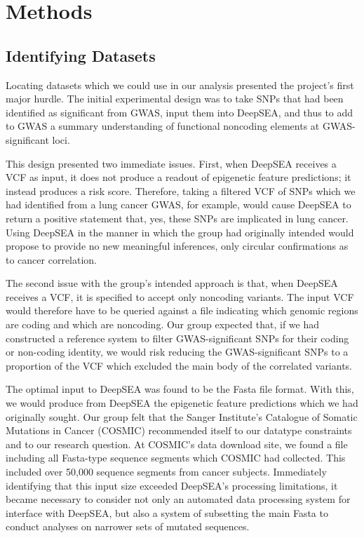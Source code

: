\documentclass{article}
\begin{document}
\section{Methods}

\subsection{Identifying Datasets}
Locating datasets which we could use in our analysis presented the project's first major hurdle. The initial experimental design was to take SNPs that had been identified as significant from GWAS, input them into DeepSEA, and thus to add to GWAS a summary understanding of functional noncoding elements at GWAS-significant loci.  

This design presented two immediate issues. First, when DeepSEA receives a VCF as input, it does not produce a readout of epigenetic feature predictions; it instead produces a risk score. Therefore, taking a filtered VCF of SNPs which we had identified from a lung cancer GWAS, for example, would cause DeepSEA to return a positive statement that, yes, these SNPs are implicated in lung cancer. Using DeepSEA in the manner in which the group had originally intended would propose to provide no new meaningful inferences, only circular confirmations as to cancer correlation. 

The second issue with the group's intended approach is that, when DeepSEA receives a VCF, it is specified to accept only noncoding variants. The input VCF would therefore have to be queried against a file indicating which genomic regions are coding and which are noncoding. Our group expected that, if we had constructed a reference system to filter GWAS-significant SNPs for their coding or non-coding identity, we would risk reducing the GWAS-significant SNPs to a proportion of the VCF which excluded the main body of the correlated variants.

The optimal input to DeepSEA was found to be the Fasta file format. With this, we would produce from DeepSEA the epigenetic feature predictions which we had originally sought. Our group felt that the Sanger Institute's Catalogue of Somatic Mutations in Cancer (COSMIC) recommended itself to our datatype constraints and to our research question. At COSMIC's data download site, we found a file including all Fasta-type sequence segments which COSMIC had collected. This included over 50,000 sequence segments from cancer subjects. Immediately identifying that this input size exceeded DeepSEA's processing limitations, it became necessary to consider not only an automated data processing system for interface with DeepSEA, but also a system of subsetting the main Fasta to conduct analyses on narrower sets of mutated sequences.
\end{document}

